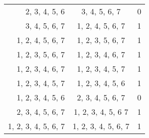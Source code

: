 \begin{solution}
\begin{enumerate}[(a)]
\begin{multicols}{2}
\begin{tabular}[t]{r|c r}
            2, 3, 4, 5, 6 & 3, 4, 5, 6, 7 & 0\\
            3, 4, 5, 6, 7 & 1, 2, 4, 5, 6, 7 & 1\\
            1, 2, 4, 5, 6, 7 & 1, 2, 3, 5, 6, 7 & 1\\
            1, 2, 3, 5, 6, 7 & 1, 2, 3, 4, 6, 7 & 1\\
            1, 2, 3, 4, 6, 7 & 1, 2, 3, 4, 5, 7 & 1\\
            1, 2, 3, 4, 5, 7 & 1, 2, 3, 4, 5, 6 & 1\\
            1, 2, 3, 4, 5, 6 & 2, 3, 4, 5, 6, 7 & 0\\
            2, 3, 4, 5, 6, 7 & 1, 2, 3, 4, 5, 6 7 & 1\\
            1, 2, 3, 4, 5, 6, 7 & 1, 2, 3, 4, 5, 6, 7 & 1
        \end{tabular}
        

\end{multicols}
\end{enumerate}
\end{solution}
